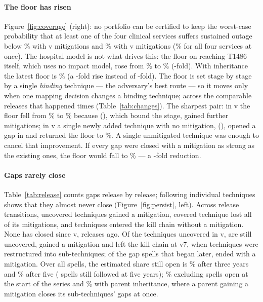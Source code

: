 \documentclass[conference,compsoc]{IEEEtran}
\begin{document}
\paragraph{The floor has risen} Figure~\ref{fig:coverage} (right): no portfolio can be
certified to keep the worst-case probability that at least one of the four clinical
services suffers sustained outage below \GapFloorFirstKOne\% with v\GapFirstVersion{}
mitigations and \GapFloorLastKOne\% with v\GapLastVersion{} mitigations
(\GapFloorLastKFour\% for all four services at once). The hospital model is not what
drives this: the floor on reaching T1486 itself, which uses no impact model, rose from
\GapControlFirst\% to \GapControlLast\% (\GapControlGrowth-fold). With inheritance the latest floor
is \GapInhFloor\% (a \GapInhFloorGrowth-fold rise instead of \GapFloorGrowth-fold). The
floor is set stage by stage by a single \emph{binding} technique --- the adversary's best
route --- so it moves only when one mapping decision changes a binding technique; across
the comparable releases that happened \GapFloorEvents{} times (Table~\ref{tab:changes}).
The sharpest pair: in v\GapDipVersion{} the floor fell from \GapDipFloorBefore\% to
\GapDipFloor\% because \GapDipTechName{} (\GapDipTech), which bound the \GapDipStage{}
stage, gained further mitigations; in v\GapRiseVersion{} a single newly added technique
with no mitigation, \GapRiseTechName{} (\GapRiseTech), opened a gap in \GapRiseStage{}
and returned the floor to \GapRiseFloor\%. A single unmitigated technique was enough to
cancel that improvement. If every gap were closed with a mitigation as strong as the
existing ones, the floor would fall to \GapFloorRepairedLastKOne\% --- a
\GapFloorRatio-fold reduction.

\paragraph{Gaps rarely close} Table~\ref{tab:release} counts gaps release by release;
following individual techniques shows that they almost never close
(Figure~\ref{fig:persist}, left). Across \CloseTransitions{} release transitions,
\CloseTotal{} uncovered techniques gained a mitigation, \CloseReversed{} covered technique lost all of its
mitigations, and \CloseNewUnc{} techniques entered the kill chain without a mitigation. None
has closed since v\CloseLastVersion{}, \CloseQuietReleases{} releases ago. Of the
\GapFirstUnc{} techniques uncovered in v\GapFirstVersion, \CloseFirstStill{} are still
uncovered, \CloseFirstCovered{} gained a mitigation and \CloseFirstRemoved{} left the
kill chain at v7, when techniques were restructured into sub-techniques; of the
\CloseEntrantSpells{} gap spells that began later, \CloseNewLater{} ended with a
mitigation. Over all \SurvSpells{} spells, the estimated share still open is
\SurvThree\% after three years and \SurvFive\% after five (\SurvFiveAtRisk{} spells
still followed at five years); \SurvEntrantsFive\% excluding spells open at the start of
the series and \SurvInhFive\% with parent inheritance, where a parent gaining a
mitigation closes its sub-techniques' gaps at once.
\end{document}

